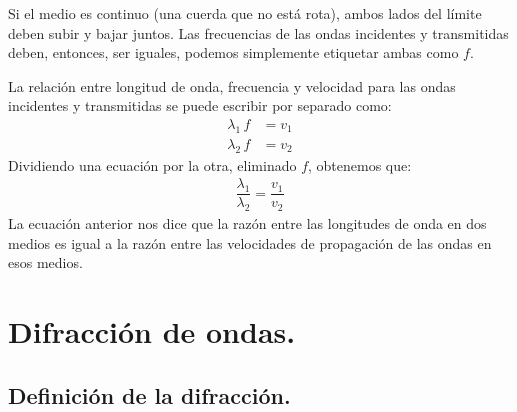 \documentclass[12pt, letter]{article}
\begin{document}
Si el medio es continuo (una cuerda que no está rota), ambos lados del límite deben subir y bajar juntos. Las frecuencias de las ondas incidentes y transmitidas deben, entonces, ser iguales, podemos simplemente etiquetar ambas como $f$.

La relación entre longitud de onda, frecuencia y velocidad para las ondas incidentes y transmitidas se puede escribir por separado como:
\begin{align*}
\lambda_{1} \, f &= v_{1} \\[0.5em]
\lambda_{2} \, f &= v_{2}
\end{align*}
Dividiendo una ecuación por la otra, eliminado $f$, obtenemos que:
\begin{align*}
\dfrac{\lambda_1}{\lambda_{2}} = \dfrac{v_{1}}{v_{2}}
\end{align*}
La ecuación anterior nos dice que la razón entre las longitudes de onda en dos medios es igual a la razón entre las velocidades de propagación de las ondas en esos medios.


\section{Difracción de ondas.}

\subsection{Definición de la difracción.}
\end{document}
